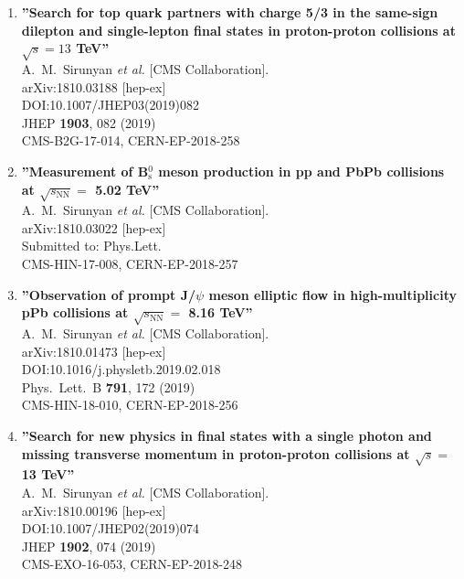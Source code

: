 \begin{enumerate}
\item%
{\bf ''Search for top quark partners with charge 5/3 in the same-sign dilepton and single-lepton final states in proton-proton collisions at $ \sqrt{s}=13 $ TeV''}
  \\{}A.~M.~Sirunyan {\it et al.} [CMS Collaboration].
  \\{}arXiv:1810.03188 [hep-ex]
  \\{}DOI:10.1007/JHEP03(2019)082
  \\{}JHEP {\bf 1903}, 082 (2019)
  \\{}CMS-B2G-17-014, CERN-EP-2018-258

\item%
{\bf ''Measurement of B$^0_\mathrm{s}$ meson production in pp and PbPb collisions at $\sqrt{s_\mathrm{NN}} =$ 5.02 TeV''}
  \\{}A.~M.~Sirunyan {\it et al.} [CMS Collaboration].
  \\{}arXiv:1810.03022 [hep-ex]
  \\{}Submitted to: Phys.Lett.
  \\{}CMS-HIN-17-008, CERN-EP-2018-257

\item%
{\bf ''Observation of prompt J/$\psi$ meson elliptic flow in high-multiplicity pPb collisions at $\sqrt{s_\mathrm{NN}} =$ 8.16 TeV''}
  \\{}A.~M.~Sirunyan {\it et al.} [CMS Collaboration].
  \\{}arXiv:1810.01473 [hep-ex]
  \\{}DOI:10.1016/j.physletb.2019.02.018
  \\{}Phys.\ Lett.\ B {\bf 791}, 172 (2019)
  \\{}CMS-HIN-18-010, CERN-EP-2018-256

\item%
{\bf ''Search for new physics in final states with a single photon and missing transverse momentum in proton-proton collisions at $\sqrt{s} =$ 13 TeV''}
  \\{}A.~M.~Sirunyan {\it et al.} [CMS Collaboration].
  \\{}arXiv:1810.00196 [hep-ex]
  \\{}DOI:10.1007/JHEP02(2019)074
  \\{}JHEP {\bf 1902}, 074 (2019)
  \\{}CMS-EXO-16-053, CERN-EP-2018-248


\end{enumerate}
